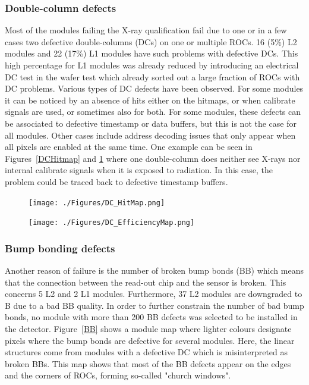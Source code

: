 \documentclass[a4paper,12pt,twoside]{article}
\begin{document}
\subsubsection{Double-column defects}
Most of the modules failing the X-ray qualification fail due to one or in a few cases two defective double-columns (DCs) on one or multiple ROCs. 16 (5\%) L2 modules and 22 (17\%) L1 modules have such problems with defective DCs. This high percentage for L1 modules was already reduced by introducing an electrical DC test in the wafer test which already sorted out a large fraction of ROCs with DC problems. Various types of DC defects have been observed. For some modules it can be noticed by an absence of hits either on the hitmaps, or when calibrate signals are used, or sometimes also for both. For some modules, these defects can be associated to defective timestamp or data buffers, but this is not the case for all modules. Other cases include address decoding issues that only appear when all pixels are enabled at the same time. One example can be seen in Figures~\ref{DCHitmap} and \ref{DCEfficiencymap} where one double-column does neither see X-rays nor internal calibrate signals when it is exposed to radiation. In this case, the problem could be traced back to defective timestamp buffers.

\begin{figure} [h!]
\centering
\begin{minipage}[t]{.48\textwidth}
  \centering
  \texttt{[image: ./Figures/DC\_HitMap.png]}
  \label{DCHitmap}
\end{minipage}%
\hspace{2mm}
\begin{minipage}[t]{.48\textwidth}
  \centering
  \texttt{[image: ./Figures/DC\_EfficiencyMap.png]}
  \label{DCEfficiencymap}
\end{minipage}
\end{figure}


\subsubsection{Bump bonding defects}
Another reason of failure is the number of broken bump bonds (BB) which means that the connection between the read-out chip and the sensor is broken. This concerns 5 L2 and 2 L1 modules. Furthermore, 37 L2 modules are downgraded to B due to a bad BB quality. In order to further constrain the number of bad bump bonds, no module with more than 200 BB defects was selected to be installed in the detector. Figure~\ref{BB} shows a module map where lighter colours designate pixels where the bump bonds are defective for several modules. Here, the linear structures come from modules with a defective DC which is misinterpreted as broken BBs. This map shows that most of the BB defects appear on the edges and the corners of ROCs, forming so-called "church windows". 
\end{document}

